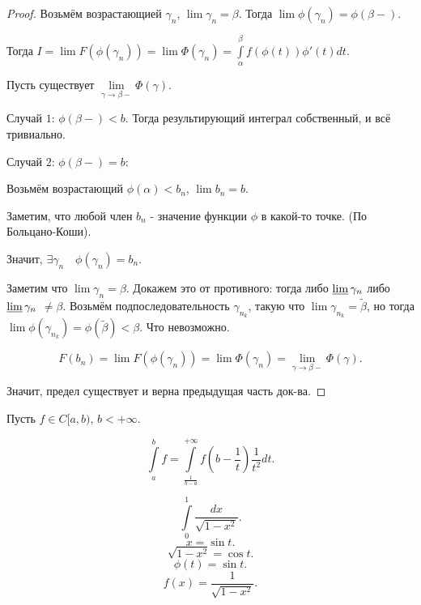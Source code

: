\begin{properties}
\begin{enumerate}
\begin{proof}
                            Возьмём возрастающией $\gamma_n$, $\lim \gamma_n = \beta$. Тогда $\lim \phi(\gamma_n) = \phi(\beta-)$.
                            
                            Тогда $I = \lim F(\phi(\gamma_n)) = \lim \Phi(\gamma_n) = \int\limits_{\alpha}^{\beta} f(\phi(t))\phi'(t)dt $.


                            Пусть существует $\lim\limits_{\gamma \to \beta-} \Phi(\gamma)$.
                            
                            Случай $1$: $\phi(\beta-) < b$. Тогда результирующий интеграл собственный, и всё тривиально.

                            Случай $2$: $\phi(\beta-) = b$:

                            Возьмём возрастающий $\phi(\alpha) < b_n$, $\lim b_n = b$.
                            
                            Заметим, что любой член $b_n$ - значение функции $\phi$ в какой-то точке. (По Больцано-Коши).

                            Значит, $\exists{\gamma_n}\quad \phi(\gamma_n) = b_n$.

                            Заметим что $\lim \gamma_n = \beta$. Докажем это от противного: тогда либо $\varliminf \gamma_n$ либо $\varliminf \gamma_n$ $\neq  \beta$. Возьмём подпоследовательность $\gamma_{n_k}$, такую что $\lim \gamma_{n_k} = \tilde{\beta}$, но тогда $\lim \phi(\gamma_{n_k}) = \phi(\tilde{\beta}) < \beta$. Что невозможно.

                            \[ F(b_n) = \lim F(\phi(\gamma_n)) = \lim \Phi(\gamma_n) = \lim\limits_{\gamma \to \beta-} \Phi(\gamma) .\]

                            Значит, предел существует и верна предыдущая часть док-ва.
                        \end{proof}
    \end{enumerate}
    \begin{remark} \thmslashn
    
        Пусть $f\in C[a, b)$, $b < +\infty$.

        \[ \int\limits_{a}^{b} f = \int\limits_{\frac{1}{b-a}}^{+\infty} f(b-\frac{1}{t}) \frac{1}{t^2}dt    .\] 
    \end{remark}
\end{properties}
\begin{example} \thmslashn

   \[ \int\limits_{0}^{1} \frac{dx}{\sqrt{1-x^2} }  .\] 
   \[ x = \sin t .\]
   \[ \sqrt{1 - x^2} = \cos t  .\]
   \[ \phi(t) = \sin t .\]
   \[ f(x) = \frac{1}{\sqrt{1-x^2} } .\] 
\end{example}
